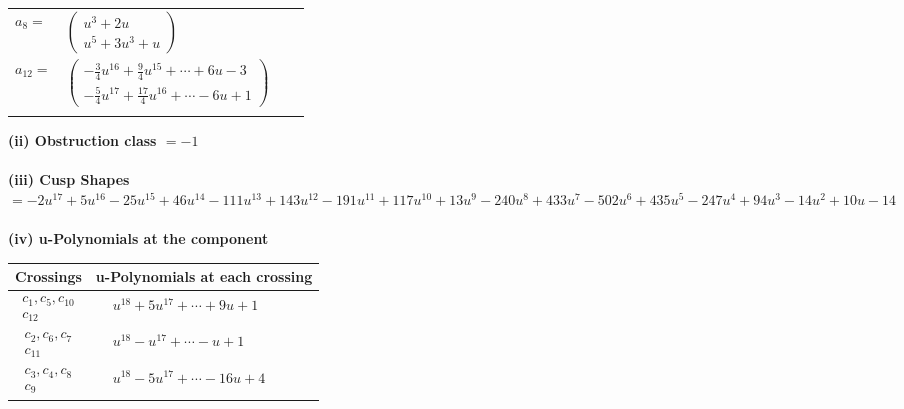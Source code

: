 \documentclass[1p]{elsarticle_modified}
\theoremstyle{definition}
\begin{document}
\begin{tabular}{m{7pt} m{180pt} m{7pt} m{180pt} }
\flushright $a_{8}=$&$\begin{pmatrix}u^3+2 u\\u^5+3 u^3+u\end{pmatrix}$ \\
\flushright $a_{12}=$&$\begin{pmatrix}-\frac{3}{4} u^{16}+\frac{9}{4} u^{15}+\cdots+6 u-3\\-\frac{5}{4} u^{17}+\frac{17}{4} u^{16}+\cdots-6 u+1\end{pmatrix}$\\&\end{tabular}
\flushleft \textbf{(ii) Obstruction class $= -1$}\\~\\
\flushleft \textbf{(iii) Cusp Shapes $= -2 u^{17}+5 u^{16}-25 u^{15}+46 u^{14}-111 u^{13}+143 u^{12}-191 u^{11}+117 u^{10}+13 u^9-240 u^8+433 u^7-502 u^6+435 u^5-247 u^4+94 u^3-14 u^2+10 u-14$}\\~\\
\newpage\renewcommand{\arraystretch}{1}
\flushleft \textbf{(iv) u-Polynomials at the component}\newline \\
\begin{tabular}{m{50pt}|m{274pt}}
Crossings & \hspace{64pt}u-Polynomials at each crossing \\
\hline $$\begin{aligned}c_{1},c_{5},c_{10}\\c_{12}\end{aligned}$$&$\begin{aligned}
&u^{18}+5 u^{17}+\cdots+9 u+1
\end{aligned}$\\
\hline $$\begin{aligned}c_{2},c_{6},c_{7}\\c_{11}\end{aligned}$$&$\begin{aligned}
&u^{18}- u^{17}+\cdots- u+1
\end{aligned}$\\
\hline $$\begin{aligned}c_{3},c_{4},c_{8}\\c_{9}\end{aligned}$$&$\begin{aligned}
&u^{18}-5 u^{17}+\cdots-16 u+4
\end{aligned}$\\
\hline
\end{tabular}\\~\\
\end{document}
